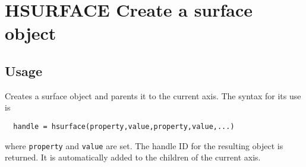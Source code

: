 \section{HSURFACE Create a surface object}

\subsection{Usage}

Creates a surface object and parents it to the current axis.  The
syntax for its use is 
\begin{verbatim}
  handle = hsurface(property,value,property,value,...)
\end{verbatim}
where \verb|property| and \verb|value| are set.  The handle ID for the
resulting object is returned.  It is automatically added to
the children of the current axis.
